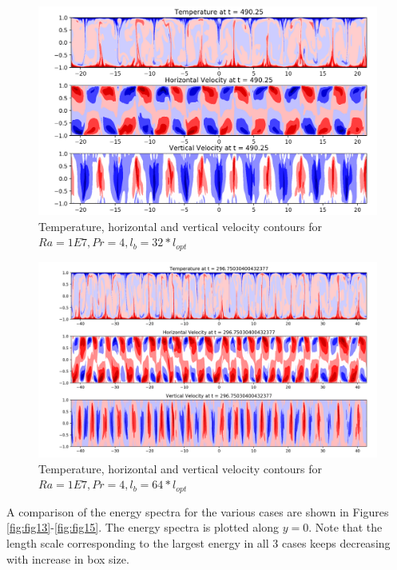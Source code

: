 \documentclass[12pt]{article}
\begin{document}
   \begin{figure}[!htb]
   	\includegraphics[width=\linewidth]{contours_1E7_4_32.png}
   	\caption{Temperature, horizontal and vertical velocity contours for $Ra = 1E7, Pr =4, l_b = 32* l_{opt} $ }
   	\label{fig:fig12}
   \end{figure}

 \begin{figure}[!htb]
 	\includegraphics[width=\linewidth]{contours_1E7_4_64.png}
 	\caption{Temperature, horizontal and vertical velocity contours for $Ra = 1E7, Pr =4, l_b = 64* l_{opt} $ }
 	\label{fig:fig12}
 \end{figure}

A comparison of the energy spectra for the various cases are shown in Figures \ref{fig:fig13}-\ref{fig:fig15}. The energy spectra is plotted along $y = 0$. Note that the length scale corresponding to the largest energy in all 3 cases keeps decreasing with increase in box size.
\end{document}
